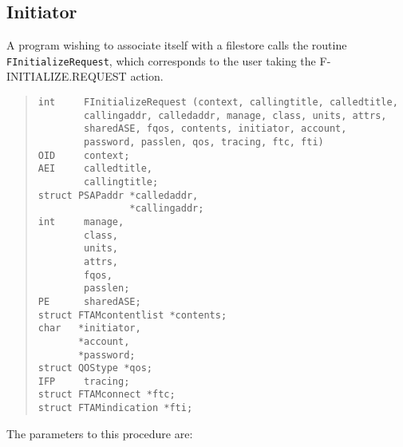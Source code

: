 \subsection	{Initiator}
A program wishing to associate itself with a filestore
calls the routine \verb"FInitializeRequest",
which corresponds to the user taking the {\sf F-INIT\-IAL\-IZE.REQUEST\/}
action.
\begin{quote}\small\begin{verbatim}
int     FInitializeRequest (context, callingtitle, calledtitle, 
        callingaddr, calledaddr, manage, class, units, attrs,
        sharedASE, fqos, contents, initiator, account,
        password, passlen, qos, tracing, ftc, fti)
OID     context;
AEI     calledtitle,
        callingtitle;
struct PSAPaddr *calledaddr,
                *callingaddr;
int     manage,
        class,
        units,
        attrs,
        fqos,
        passlen;
PE      sharedASE;
struct FTAMcontentlist *contents;
char   *initiator,
       *account,
       *password;
struct QOStype *qos;
IFP     tracing;
struct FTAMconnect *ftc;
struct FTAMindication *fti;
\end{verbatim}\end{quote}
The parameters to this procedure are:
